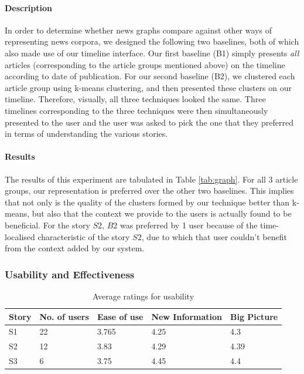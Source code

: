 \normalsize

\paragraph*{Description} In order to determine whether news graphs compare against other ways of representing news corpora, we designed the following two baselines, both of which also made use of our timeline interface. Our first baseline (B1) simply presents \emph{all} articles (corresponding to the article groups mentioned above) on the timeline according to date of publication. For our second baseline (B2), we clustered each article group using k-means clustering, and then presented these clusters on our timeline. Therefore, visually, all three techniques looked the same. Three timelines corresponding to the three techniques were then simultaneously presented to the user and the user was asked to pick the one that they preferred in terms of understanding the various stories.

\paragraph*{Results} The results of this experiment are tabulated in Table \ref{tab:graph}. For all 3 article groups, our representation is preferred over the other two baselines. This implies that not only is the quality of the clusters formed by our technique better than k-means, but also that the context we provide to the users is actually found to be beneficial. For the story $S2$, $B2$ was preferred by 1 user because of the time-localised characteristic of the story $S2$, due to which that user couldn't benefit from the context added by our system.



\subsubsection{Usability and Effectiveness}

\begin{table}
\begin{center}
\small
\begin{tabular}{|l|p{1.5cm}|p{1.25cm}|p{1.5cm}|p{1.5cm}|}
\hline
{\bf Story} & {\bf No. of users} & {\bf Ease of use} & {\bf New Information} & {\bf Big Picture}\\
\hline
S1 & 22 & 3.765 & 4.25 & 4.3\\
S2 & 12 & 3.83 & 4.29 & 4.39\\
S3 & 6 & 3.75 & 4.45 & 4.4\\
\hline
\end{tabular}
\end{center}
\caption{Average ratings for usability}
\label{tab:ease}
\end{table}

